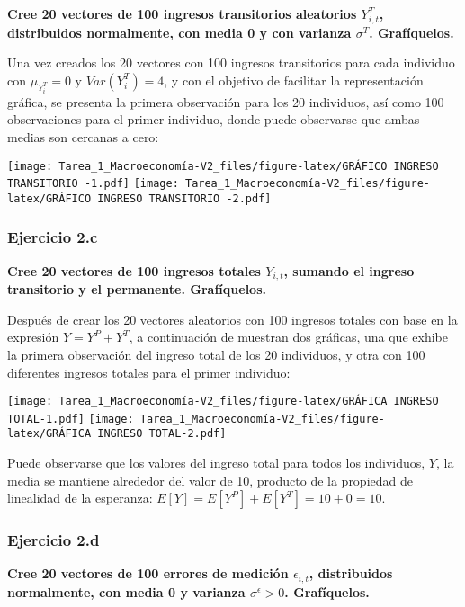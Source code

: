 \documentclass[
]{article}
\begin{document}
\textbf{Cree 20 vectores de 100 ingresos transitorios aleatorios
\(Y_{i,t}^T\), distribuidos normalmente, con media 0 y con varianza
\(\sigma^T\). Grafíquelos.}

Una vez creados los 20 vectores con 100 ingresos transitorios para cada
individuo con \(\mu_{Y^T_{i}} = 0\) y \(Var(Y^T_{i}) = 4\), y con el
objetivo de facilitar la representación gráfica, se presenta la primera
observación para los 20 individuos, así como 100 observaciones para el
primer individuo, donde puede observarse que ambas medias son cercanas a
cero:

\texttt{[image: Tarea\_1\_Macroeconomía-V2\_files/figure-latex/GRÁFICO INGRESO TRANSITORIO -1.pdf]}
\texttt{[image: Tarea\_1\_Macroeconomía-V2\_files/figure-latex/GRÁFICO INGRESO TRANSITORIO -2.pdf]}
\newpage

\hypertarget{ejercicio-2.c}{%
\subsubsection{Ejercicio 2.c}\label{ejercicio-2.c}}

\textbf{Cree 20 vectores de 100 ingresos totales \(Y_{i,t}\), sumando el
ingreso transitorio y el permanente. Grafíquelos.}

Después de crear los 20 vectores aleatorios con 100 ingresos totales con
base en la expresión \(Y = Y^P + Y^T\), a continuación de muestran dos
gráficas, una que exhibe la primera observación del ingreso total de los
20 individuos, y otra con 100 diferentes ingresos totales para el primer
individuo:

\texttt{[image: Tarea\_1\_Macroeconomía-V2\_files/figure-latex/GRÁFICA INGRESO TOTAL-1.pdf]}
\texttt{[image: Tarea\_1\_Macroeconomía-V2\_files/figure-latex/GRÁFICA INGRESO TOTAL-2.pdf]}

Puede observarse que los valores del ingreso total para todos los
individuos, \(Y\), la media se mantiene alrededor del valor de 10,
producto de la propiedad de linealidad de la esperanza:
\(E[Y] = E[Y^P] + E[Y^T] = 10 + 0 = 10\).

\newpage

\hypertarget{ejercicio-2.d}{%
\subsubsection{Ejercicio 2.d}\label{ejercicio-2.d}}

\textbf{Cree 20 vectores de 100 errores de medición \(\epsilon_{i,t}\),
distribuidos normalmente, con media 0 y varianza \(\sigma^\epsilon>0\).
Grafíquelos.}
\end{document}
